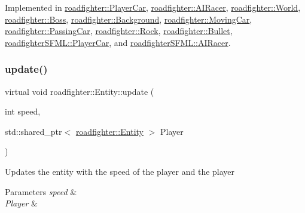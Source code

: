 Implemented in \hyperlink{classroadfighter_1_1PlayerCar_a47772fa1d9fcdba69f288112d5359acd}{roadfighter\+::\+Player\+Car}, \hyperlink{classroadfighter_1_1AIRacer_a92afd3d1bfcd290d3b012cbfe44d5a77}{roadfighter\+::\+A\+I\+Racer}, \hyperlink{classroadfighter_1_1World_af4988cdad9b54a049de1a29ff87679ec}{roadfighter\+::\+World}, \hyperlink{classroadfighter_1_1Boss_aa097f1f2e3fe76645233a4ba75ee6256}{roadfighter\+::\+Boss}, \hyperlink{classroadfighter_1_1Background_a6fa762ca6aa2f18918c1b715ae94395f}{roadfighter\+::\+Background}, \hyperlink{classroadfighter_1_1MovingCar_a06c6e2e0510707bdd7e4570b8f65241c}{roadfighter\+::\+Moving\+Car}, \hyperlink{classroadfighter_1_1PassingCar_a45276fb9270a145fed9a7827a9ab7a46}{roadfighter\+::\+Passing\+Car}, \hyperlink{classroadfighter_1_1Rock_a28d9c3334f54db88785696076a8b6c9c}{roadfighter\+::\+Rock}, \hyperlink{classroadfighter_1_1Bullet_aab45c1cb9088b11c17e7a238543d8006}{roadfighter\+::\+Bullet}, \hyperlink{classroadfighterSFML_1_1PlayerCar_a1fb9b80b068e689bef90cad28c53869c}{roadfighter\+S\+F\+M\+L\+::\+Player\+Car}, and \hyperlink{classroadfighterSFML_1_1AIRacer_aaecd91860a2ac61ef671000e311b7860}{roadfighter\+S\+F\+M\+L\+::\+A\+I\+Racer}.

\mbox{\label{classroadfighter_1_1Entity_a611ba56595dd2137d308876ba820cc09}} 
\subsubsection{\texorpdfstring{update()}{update()}\hspace{0.1cm}{\footnotesize\ttfamily [2/2]}}
{\footnotesize\ttfamily virtual void roadfighter\+::\+Entity\+::update (\begin{DoxyParamCaption}\item[{int}]{speed,  }\item[{std\+::shared\+\_\+ptr$<$ \hyperlink{classroadfighter_1_1Entity}{roadfighter\+::\+Entity} $>$}]{Player }\end{DoxyParamCaption})\hspace{0.3cm}{\ttfamily [pure virtual]}}

Updates the entity with the speed of the player and the player 
\begin{DoxyParams}{Parameters}
{\em speed} & \\
\hline
{\em Player} & \\
\hline
\end{DoxyParams}


